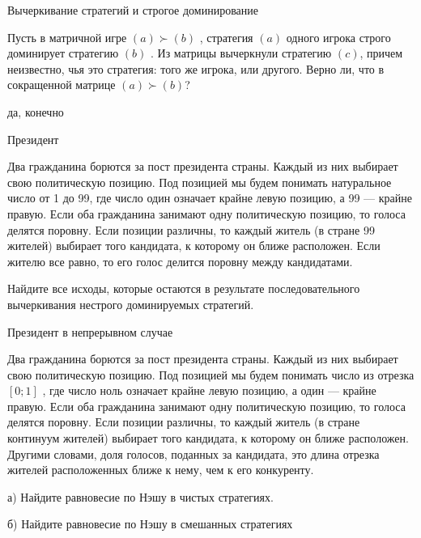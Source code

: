 \begin{problem}
 Вычеркивание стратегий и строгое доминирование\par
Пусть в матричной игре  $\left(a\right)\succ \left(b\right)$ , стратегия  $\left(a\right)$  одного игрока строго доминирует стратегию  $\left(b\right)$ . Из матрицы вычеркнули стратегию  $\left(c\right)$, причем неизвестно, чья это стратегия: того же игрока, или другого. Верно ли, что в сокращенной матрице  $\left(a\right)\succ \left(b\right)$?




\begin{sol}
да, конечно
\end{sol}
\end{problem}




\begin{problem}
 Президент\par
Два гражданина борются за пост президента страны. Каждый из них выбирает свою политическую позицию. Под позицией мы будем понимать натуральное число от 1 до 99, где число один означает крайне левую позицию, а 99 — крайне правую. Если оба гражданина занимают одну политическую позицию, то голоса делятся поровну. Если позиции различны, то каждый житель (в стране 99 жителей) выбирает того кандидата, к которому он ближе расположен. Если жителю все равно, то его голос делится поровну между кандидатами.\par
Найдите все исходы, которые остаются в результате последовательного вычеркивания нестрого доминируемых стратегий.



\begin{sol}

\end{sol}
\end{problem}



\begin{problem}
 Президент в непрерывном случае\par
Два гражданина борются за пост президента страны. Каждый из них выбирает свою политическую позицию. Под позицией мы будем понимать число из отрезка  $\left[0;1\right]$ , где число ноль означает крайне левую позицию, а один — крайне правую. Если оба гражданина занимают одну политическую позицию, то голоса делятся поровну. Если позиции различны, то каждый житель (в стране континуум жителей) выбирает того кандидата, к которому он ближе расположен. Другими словами, доля голосов, поданных за кандидата, это длина отрезка жителей расположенных ближе к нему, чем к его конкуренту.

а)	Найдите равновесие по Нэшу в чистых стратегиях.

б)	Найдите равновесие по Нэшу в смешанных стратегиях



\begin{sol}

\end{sol}
\end{problem}



